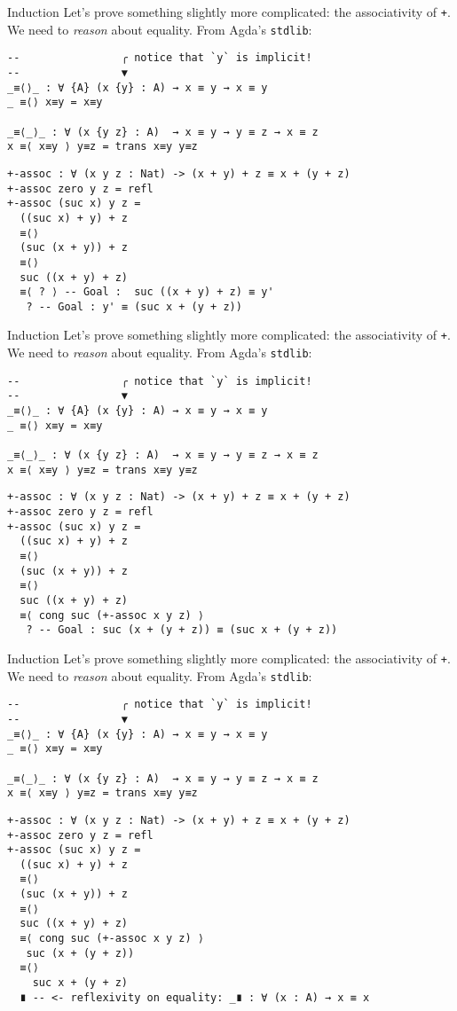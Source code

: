\documentclass[t,aspectratio=169,9pt]{beamer}
\begin{document}
\begin{frame}[fragile]{Induction}
  Let's prove something slightly more complicated: the associativity of
  \texttt{+}. We need to {\it reason} about equality. From Agda's
  \texttt{stdlib}:
\begin{verbatim}
--                ╭ notice that `y` is implicit!
--                ▼
_≡⟨⟩_ : ∀ {A} (x {y} : A) → x ≡ y → x ≡ y
_ ≡⟨⟩ x≡y = x≡y

_≡⟨_⟩_ : ∀ (x {y z} : A)  → x ≡ y → y ≡ z → x ≡ z
x ≡⟨ x≡y ⟩ y≡z = trans x≡y y≡z
\end{verbatim}
\begin{verbatim}
+-assoc : ∀ (x y z : Nat) -> (x + y) + z ≡ x + (y + z)
+-assoc zero y z = refl
+-assoc (suc x) y z =
  ((suc x) + y) + z
  ≡⟨⟩
  (suc (x + y)) + z
  ≡⟨⟩
  suc ((x + y) + z)
  ≡⟨ ? ⟩ -- Goal :  suc ((x + y) + z) ≡ y'
   ? -- Goal : y' ≡ (suc x + (y + z))
\end{verbatim}
\end{frame}
\begin{frame}[fragile]{Induction}
  Let's prove something slightly more complicated: the associativity of
  \texttt{+}. We need to {\it reason} about equality. From Agda's
  \texttt{stdlib}:
\begin{verbatim}
--                ╭ notice that `y` is implicit!
--                ▼
_≡⟨⟩_ : ∀ {A} (x {y} : A) → x ≡ y → x ≡ y
_ ≡⟨⟩ x≡y = x≡y

_≡⟨_⟩_ : ∀ (x {y z} : A)  → x ≡ y → y ≡ z → x ≡ z
x ≡⟨ x≡y ⟩ y≡z = trans x≡y y≡z
\end{verbatim}
\begin{verbatim}
+-assoc : ∀ (x y z : Nat) -> (x + y) + z ≡ x + (y + z)
+-assoc zero y z = refl
+-assoc (suc x) y z =
  ((suc x) + y) + z
  ≡⟨⟩
  (suc (x + y)) + z
  ≡⟨⟩
  suc ((x + y) + z)
  ≡⟨ cong suc (+-assoc x y z) ⟩
   ? -- Goal : suc (x + (y + z)) ≡ (suc x + (y + z))
\end{verbatim}
\end{frame}
\begin{frame}[fragile]{Induction}
  Let's prove something slightly more complicated: the associativity of
  \texttt{+}. We need to {\it reason} about equality. From Agda's
  \texttt{stdlib}:
\begin{verbatim}
--                ╭ notice that `y` is implicit!
--                ▼
_≡⟨⟩_ : ∀ {A} (x {y} : A) → x ≡ y → x ≡ y
_ ≡⟨⟩ x≡y = x≡y

_≡⟨_⟩_ : ∀ (x {y z} : A)  → x ≡ y → y ≡ z → x ≡ z
x ≡⟨ x≡y ⟩ y≡z = trans x≡y y≡z
\end{verbatim}
\begin{verbatim}
+-assoc : ∀ (x y z : Nat) -> (x + y) + z ≡ x + (y + z)
+-assoc zero y z = refl
+-assoc (suc x) y z =
  ((suc x) + y) + z
  ≡⟨⟩
  (suc (x + y)) + z
  ≡⟨⟩
  suc ((x + y) + z)
  ≡⟨ cong suc (+-assoc x y z) ⟩
   suc (x + (y + z))
  ≡⟨⟩
    suc x + (y + z)
  ∎ -- <- reflexivity on equality: _∎ : ∀ (x : A) → x ≡ x
\end{verbatim}
\end{frame}
\end{document}

